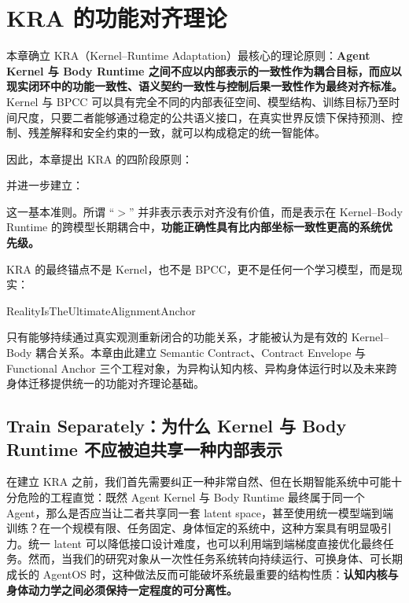 \chapter{KRA 的功能对齐理论}
\label{chap:kra-functional-alignment}

\begin{chapterlead}
本章确立 KRA（Kernel--Runtime Adaptation）最核心的理论原则：\textbf{Agent Kernel 与 Body Runtime 之间不应以内部表示的一致性作为耦合目标，而应以现实闭环中的功能一致性、语义契约一致性与控制后果一致性作为最终对齐标准。} Kernel 与 BPCC 可以具有完全不同的内部表征空间、模型结构、训练目标乃至时间尺度，只要二者能够通过稳定的公共语义接口，在真实世界反馈下保持预测、控制、残差解释和安全约束的一致，就可以构成稳定的统一智能体。

因此，本章提出 KRA 的四阶段原则：
\begin{statementbox}
\centering
{}
\end{statementbox}
并进一步建立：
\begin{statementbox}
\centering
{}
\end{statementbox}
这一基本准则。所谓 ``$>$'' 并非表示表示对齐没有价值，而是表示在 Kernel--Body Runtime 的跨模型长期耦合中，\textbf{功能正确性具有比内部坐标一致性更高的系统优先级。}

KRA 的最终锚点不是 Kernel，也不是 BPCC，更不是任何一个学习模型，而是现实：
\begin{statementbox}
RealityIsTheUltimateAlignmentAnchor
\end{statementbox}
只有能够持续通过真实观测重新闭合的功能关系，才能被认为是有效的 Kernel--Body 耦合关系。本章由此建立 Semantic Contract、Contract Envelope 与 Functional Anchor 三个工程对象，为异构认知内核、异构身体运行时以及未来跨身体迁移提供统一的功能对齐理论基础。
\end{chapterlead}

\section{Train Separately：为什么 Kernel 与 Body Runtime 不应被迫共享一种内部表示}

在建立 KRA 之前，我们首先需要纠正一种非常自然、但在长期智能系统中可能十分危险的工程直觉：既然 Agent Kernel 与 Body Runtime 最终属于同一个 Agent，那么是否应当让二者共享同一套 latent space，甚至使用统一模型端到端训练？在一个规模有限、任务固定、身体恒定的系统中，这种方案具有明显吸引力。统一 latent 可以降低接口设计难度，也可以利用端到端梯度直接优化最终任务。然而，当我们的研究对象从一次性任务系统转向持续运行、可换身体、可长期成长的 AgentOS 时，这种做法反而可能破坏系统最重要的结构性质：\textbf{认知内核与身体动力学之间必须保持一定程度的可分离性。}

